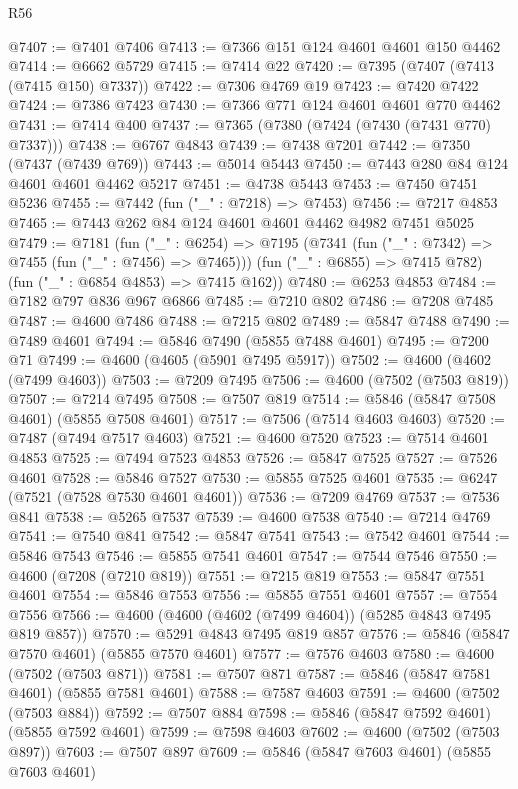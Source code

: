 \begin{lexlean}{R56}
\begin{coremodule}
@7407 := @7401 @7406
@7413 := @7366 @151 @124 @4601 @4601 @150 @4462
@7414 := @6662 @5729
@7415 := @7414 @22
@7420 := @7395 (@7407 (@7413 (@7415 @150) @7337))
@7422 := @7306 @4769 @19
@7423 := @7420 @7422
@7424 := @7386 @7423
@7430 := @7366 @771 @124 @4601 @4601 @770 @4462
@7431 := @7414 @400
@7437 := @7365 (@7380 (@7424 (@7430 (@7431 @770) @7337)))
@7438 := @6767 @4843
@7439 := @7438 @7201
@7442 := @7350 (@7437 (@7439 @769))
@7443 := @5014 @5443
@7450 := @7443 @280 @84 @124 @4601 @4601 @4462 @5217
@7451 := @4738 @5443
@7453 := @7450 @7451 @5236
@7455 := @7442 (fun ("_" : @7218) => @7453)
@7456 := @7217 @4853
@7465 := @7443 @262 @84 @124 @4601 @4601 @4462 @4982 @7451 @5025
@7479 := @7181
    (fun ("_" : @6254) =>
    @7195
      (@7341 (fun ("_" : @7342) => @7455 (fun ("_" : @7456) => @7465)))
      (fun ("_" : @6855) => @7415 @782)
      (fun ("_" : @6854 @4853) => @7415 @162))
@7480 := @6253 @4853
@7484 := @7182 @797 @836 @967 @6866
@7485 := @7210 @802
@7486 := @7208 @7485
@7487 := @4600 @7486
@7488 := @7215 @802
@7489 := @5847 @7488
@7490 := @7489 @4601
@7494 := @5846 @7490 (@5855 @7488 @4601)
@7495 := @7200 @71
@7499 := @4600 (@4605 (@5901 @7495 @5917))
@7502 := @4600 (@4602 (@7499 @4603))
@7503 := @7209 @7495
@7506 := @4600 (@7502 (@7503 @819))
@7507 := @7214 @7495
@7508 := @7507 @819
@7514 := @5846 (@5847 @7508 @4601) (@5855 @7508 @4601)
@7517 := @7506 (@7514 @4603 @4603)
@7520 := @7487 (@7494 @7517 @4603)
@7521 := @4600 @7520
@7523 := @7514 @4601 @4853
@7525 := @7494 @7523 @4853
@7526 := @5847 @7525
@7527 := @7526 @4601
@7528 := @5846 @7527
@7530 := @5855 @7525 @4601
@7535 := @6247 (@7521 (@7528 @7530 @4601 @4601))
@7536 := @7209 @4769
@7537 := @7536 @841
@7538 := @5265 @7537
@7539 := @4600 @7538
@7540 := @7214 @4769
@7541 := @7540 @841
@7542 := @5847 @7541
@7543 := @7542 @4601
@7544 := @5846 @7543
@7546 := @5855 @7541 @4601
@7547 := @7544 @7546
@7550 := @4600 (@7208 (@7210 @819))
@7551 := @7215 @819
@7553 := @5847 @7551 @4601
@7554 := @5846 @7553
@7556 := @5855 @7551 @4601
@7557 := @7554 @7556
@7566 := @4600 (@4600 (@4602 (@7499 @4604)) (@5285 @4843 @7495 @819 @857))
@7570 := @5291 @4843 @7495 @819 @857
@7576 := @5846 (@5847 @7570 @4601) (@5855 @7570 @4601)
@7577 := @7576 @4603
@7580 := @4600 (@7502 (@7503 @871))
@7581 := @7507 @871
@7587 := @5846 (@5847 @7581 @4601) (@5855 @7581 @4601)
@7588 := @7587 @4603
@7591 := @4600 (@7502 (@7503 @884))
@7592 := @7507 @884
@7598 := @5846 (@5847 @7592 @4601) (@5855 @7592 @4601)
@7599 := @7598 @4603
@7602 := @4600 (@7502 (@7503 @897))
@7603 := @7507 @897
@7609 := @5846 (@5847 @7603 @4601) (@5855 @7603 @4601)

\end{coremodule}
\end{lexlean}
